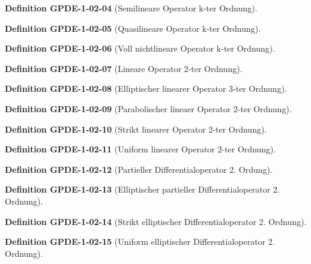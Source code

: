 \documentclass[10pt, letterpaper]{article}
\newcommand{\CustomHeading}[3]{%
  \par\medskip\noindent%
  \textbf{#1 #2} \textnormal{(#3)}.\enskip%
}
\newenvironment{DEF}[2]{\CustomHeading{Definition}{#1}{#2}}{}
\begin{document}
\begin{DEF}{GPDE-1-02-04}{Semilineare Operator k-ter Ordnung}
\end{DEF}

\begin{DEF}{GPDE-1-02-05}{Quasilineare Operator k-ter Ordnung}
\end{DEF}

\begin{DEF}{GPDE-1-02-06}{Voll nichtlineare Operator k-ter Ordnung}
\end{DEF}

\begin{DEF}{GPDE-1-02-07}{Lineare Operator 2-ter Ordnung}
\end{DEF}

\begin{DEF}{GPDE-1-02-08}{Elliptischer linearer Operator 3-ter Ordnung}
\end{DEF}

\begin{DEF}{GPDE-1-02-09}{Parabolischer lineaer Operator 2-ter Ordnung}
\end{DEF}

\begin{DEF}{GPDE-1-02-10}{Strikt linearer Operator 2-ter Ordnung}
\end{DEF}

\begin{DEF}{GPDE-1-02-11}{Uniform linearer Operator 2-ter Ordnung}
\end{DEF}

\begin{DEF}{GPDE-1-02-12}{Partieller Differentialoperator 2. Ordung}
\end{DEF}

\begin{DEF}{GPDE-1-02-13}{Elliptischer partieller Differentialoperator 2. Ordnung}
\end{DEF}

\begin{DEF}{GPDE-1-02-14}{Strikt elliptischer Differentialoperator 2. Ordnung}
\end{DEF}

\begin{DEF}{GPDE-1-02-15}{Uniform elliptischer Differentialoperator 2. Ordnung}
\end{DEF}
\end{document}
